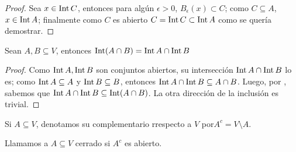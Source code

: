 \begin{proof}
  Sea $x\in \operatorname{Int} C$, entonces para algún $\epsilon >0$, $B_\epsilon (x)\subset C$; como $C\subseteq A$, $x\in \operatorname{Int} A$; finalmente como $C$ es abierto $C=\operatorname{Int} C\subset \operatorname{Int} A$ como se quería demostrar.
\end{proof}
\begin{lemma}
    Sean $A,B\subseteq V$, entonces $\operatorname{Int}(A \cap B)= \operatorname{Int} A \cap \operatorname{Int} B$ 
 \end{lemma}
 \begin{proof}
   Como $\operatorname{Int} A, \operatorname{Int} B$ son conjuntos abiertos, su intersección $\operatorname{Int} A \cap \operatorname{Int} B$ lo es; como $\operatorname{Int} A \subseteq A$ y $\operatorname{Int} B \subseteq B$, entonces $\operatorname{Int} A \cap \operatorname{Int} B \subseteq A \cap B$. Luego, por , sabemos que $\operatorname{Int} A \cap \operatorname{Int} B \subseteq \operatorname{Int}(A\cap B)$. La otra dirección de la inclusión es trivial.
 \end{proof}
 \begin{definition}
   Si $A\subseteq V$, denotamos su complementario rrespecto a $V$ por$A^c=V\setminus A$.
 \end{definition}
 \begin{definition}
   Llamamos a $A\subseteq V$ cerrado si $A^c$ es abierto.
 \end{definition}
